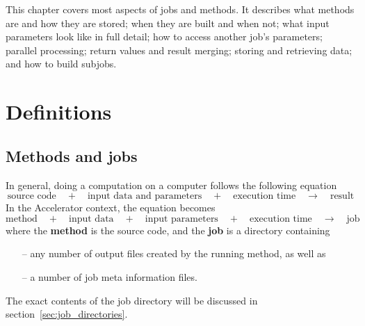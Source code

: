 

This chapter covers most aspects of jobs and methods.  It describes
what methods are and how they are stored; when they are built and when
not; what input parameters look like in full detail; how to access
another job's parameters; parallel processing; return values and
result merging; storing and retrieving data; and how to build subjobs.



\section{Definitions}

\subsection{Methods and jobs}

In general, doing a computation on a computer follows the following
equation
\[
  \text{source code} \quad+\quad \text{input data and parameters}
  \quad+\quad \text{execution time} \quad\rightarrow\quad
  \text{result}
\]
In the Accelerator context, the equation becomes
\[
  \text{method} \quad+\quad \text{input data} \quad+\quad \text{input
    parameters} \quad+\quad \text{execution time}
  \quad\rightarrow\quad \text{job}
\]
where the \textbf{method} is the source code, and the \textbf{job} is
a directory containing
\begin{itemize}
\item[--] any number of output files created by the running method, as well as
\item[--] a number of job meta information files.
\end{itemize}
The exact contents of the job directory will be discussed in section~\ref{sec:job_directories}.

